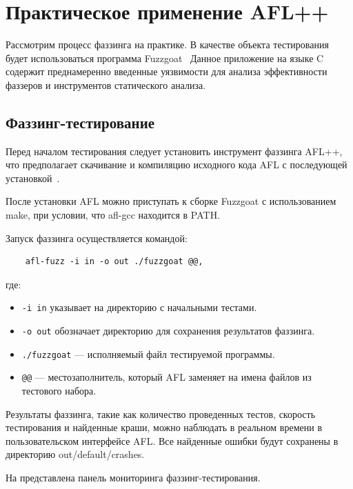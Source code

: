 \chapter{Практическое применение AFL++} \label{ch4}
Рассмотрим процесс фаззинга на практике. В качестве объекта тестирования будет использоваться программа Fuzzgoat~\cite{???} %
Данное приложение на языке C содержит преднамеренно введенные уязвимости для анализа эффективности фаззеров и инструментов статического анализа.
\section{Фаззинг-тестирование} \label{ch4:sec1}

Перед началом тестирования следует установить инструмент фаззинга AFL++, что предполагает скачивание и компиляцию исходного кода AFL с последующей установкой~\cite{???}. %

После установки AFL можно приступать к сборке Fuzzgoat с использованием make, при условии, что afl-gcc находится в PATH.

Запуск фаззинга осуществляется командой:
\begin{verbatim}
	afl-fuzz -i in -o out ./fuzzgoat @@,
\end{verbatim}

где:
\begin{itemize}
	\item \texttt{-i in} указывает на директорию с начальными тестами.
	\item \texttt{-o out} обозначает директорию для сохранения результатов фаззинга.
	\item \texttt{./fuzzgoat} — исполняемый файл тестируемой программы.
	\item \texttt{@@} — местозаполнитель, который AFL заменяет на имена файлов из тестового набора.
\end{itemize}

Результаты фаззинга, такие как количество проведенных тестов, скорость тестирования и найденные краши, можно наблюдать в реальном времени в пользовательском интерфейсе AFL. Все найденные ошибки будут сохранены в директорию out/default/crashes.

На  представлена панель мониторинга фаззинг-тестирования.

